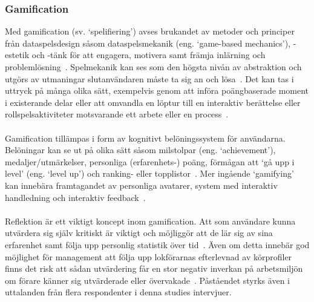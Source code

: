 \subsubsection{Gamification}
Med gamification (sv. \lq{}spelifiering\rq{}) avses brukandet av metoder och principer från dataspelsdesign såsom dataspelsmekanik (eng. \lq{}game-based mechanics\rq{}), -estetik och -tänk för att engagera, motivera samt främja inlärning och problemlösning~\cite{Bae2014, Cwil2018}.
Spelmekanik kan ses som den högsta nivån av abstraktion och utgörs av utmaningar slutanvändaren måste ta sig an och lösa~\cite{Cwil2018}.
Det kan tas i uttryck på många olika sätt, exempelvis genom att införa poängbaserade moment i existerande delar eller att omvandla en löptur till en interaktiv berättelse eller rollspelsaktiviteter motsvarande ett arbete eller en process~\cite{Bae2014}.
\paragraph{}
\hspace{-12pt}Gamification tillämpas i form av kognitivt belöningssystem för användarna.
Belöningar kan se ut på olika sätt såsom milstolpar (eng. \lq{}achievement\rq{}), medaljer/utmärkelser, personliga (erfarenhets-) poäng, förmågan att \lq{}gå upp i level\rq{} (eng. \lq{}level up\rq{}) och ranking- eller topplistor~\cite{Bae2014}.
Mer ingående \lq{}gamifying\rq{} kan innebära framtagandet av personliga avatarer, system med interaktiv handledning och interaktiv feedback~\cite{Bae2014, Cwil2018}.
\paragraph{}
\hspace{-12pt}Reflektion är ett viktigt koncept inom gamification.
Att som användare kunna utvärdera sig själv kritiskt är viktigt och möjliggör att de lär sig av sina erfarenhet samt följa upp personlig statistik över tid~\cite{Bae2014, Cwil2018}.
Även om detta innebär god möjlighet för management att följa upp lokförarnas efterlevnad av körprofiler finns det risk att sådan utvärdering får en stor negativ inverkan på arbetsmiljön om förare känner sig utvärderade eller övervakade~\cite{Bae2014}.
Påståendet styrks även i uttalanden från flera respondenter i denna studies intervjuer.
